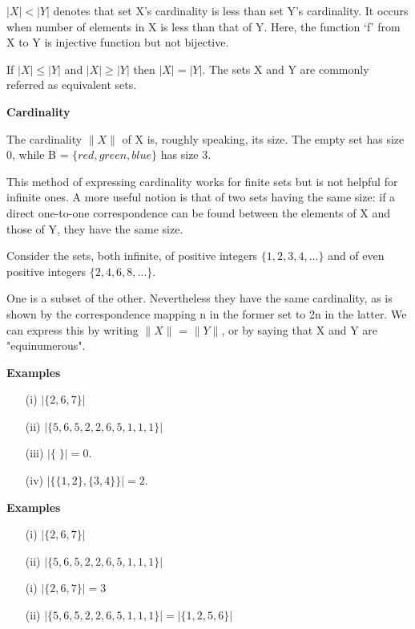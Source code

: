 \documentclass[]{article}
\begin{document}
$|X|<|Y|$ denotes that set X’s cardinality is less than set Y’s cardinality. It occurs when number of elements in X is less than that of Y. Here, the function ‘f’ from X to Y is injective function but not bijective.

If $|X|\leq|Y|$ and $|X|\geq|Y|$ then $|X|=|Y|$. The sets X and Y are commonly referred as equivalent sets.

\textbf{Cardinality}

\noindent The cardinality $\|X\|$ of X is, roughly speaking, its size. 
The empty set has size 0, while B = $\{red, green, blue\}$ has size 3. 

This method of expressing cardinality works for finite sets but is not helpful for infinite ones. A more useful notion is that of two sets having the same size: if a direct one-to-one correspondence can be found between the elements of X and those of Y, they have the same size. 

Consider the sets, both infinite, of positive integers $\{1,2,3,4, \ldots\}$ and of even positive integers $\{2,4,6,8, \ldots\}$. 

One is a subset of the other. Nevertheless they have the same cardinality, as is shown by the correspondence mapping n in the former set to 2n in the latter. We can express this by writing $\|X\|$ = $\|Y\|$, or by saying that X and Y are "equinumerous".

\textbf{Examples}
\begin{itemize}
\item[(i)] $|\{2,6,7\}|$
\item[(ii)] $|\{5,6,5,2,2,6,5,1,1,1\}|$
\item[(iii)] $|\{ \;\}| = 0$. %
\item[(iv)] $|\{\{1,2\},\{3,4\}\}| = 2$. 
\end{itemize}



\textbf{Examples}
\begin{itemize}
\item[(i)] $|\{2,6,7\}| $

\item[(ii)] $|\{5,6,5,2,2,6,5,1,1,1\}| $

\item[(i)] $|\{2,6,7\}| = 3 $

\item[(ii)] $|\{5,6,5,2,2,6,5,1,1,1\}| = |\{1,2,5,6\}| $
\end{itemize}
\end{document}
